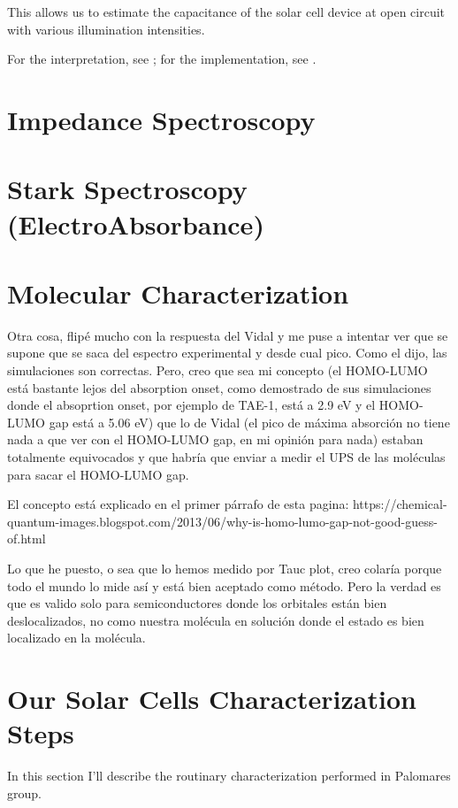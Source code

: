 	This allows us to estimate the capacitance of the solar cell device at open circuit with various illumination intensities.

	For the interpretation, see ; for the implementation, see .

\section{Impedance Spectroscopy}

\section{Stark Spectroscopy (ElectroAbsorbance)}

\section{Molecular Characterization}

	Otra cosa, flipé mucho con la respuesta del Vidal y me puse a intentar
	ver que se supone que se saca del espectro experimental y desde cual
	pico. Como el dijo, las simulaciones son correctas.
	Pero, creo que sea mi concepto (el HOMO-LUMO está bastante lejos del
	absorption onset, como demostrado de sus simulaciones donde el
	absoprtion onset, por ejemplo de TAE-1, está a 2.9 eV y el HOMO-LUMO gap
	está a 5.06 eV) que lo de Vidal (el pico de máxima absorción no tiene
	nada a que ver con el HOMO-LUMO gap, en mi opinión para nada) estaban
	totalmente equivocados y que habría que enviar a medir el UPS de las
	moléculas para sacar el HOMO-LUMO gap.

	El concepto está explicado en el primer párrafo de esta pagina:
	https://chemical-quantum-images.blogspot.com/2013/06/why-is-homo-lumo-gap-not-good-guess-of.html

	Lo que he puesto, o sea que lo hemos medido por Tauc plot, creo colaría
	porque todo el mundo lo mide así y está bien aceptado como método. Pero
	la verdad es que es valido solo para semiconductores donde los orbitales
	están bien deslocalizados, no como nuestra molécula en solución donde el
	estado es bien localizado en la molécula.

\section{Our Solar Cells Characterization Steps}

	In this section I'll describe the routinary characterization performed in Palomares group.


